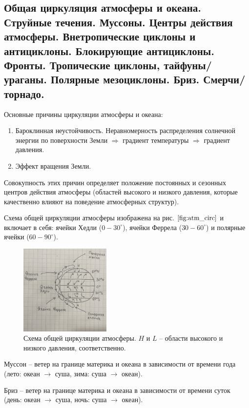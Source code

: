 \subsection{Общая циркуляция атмосферы и океана. Струйные течения. Муссоны. Центры действия атмосферы. Внетропические циклоны и антициклоны. Блокирующие антициклоны. Фронты. Тропические циклоны, тайфуны/ураганы. Полярные мезоциклоны. Бриз. Смерчи/торнадо.}
Основные причины циркуляции атмосферы и океана:
\begin{enumerate}
\item Бароклинная неустойчивость. Неравномерность распределения солнечной энергии по поверхности Земли $\Rightarrow$ градиент температуры $\Rightarrow$ градиент давления.
\item Эффект вращения Земли.
\end{enumerate}

Совокупность этих причин определяет положение постоянных и сезонных центров действия атмосферы (областей высокого и низкого давления, которые качественно влияют на поведение атмосферных структур).

Схема общей циркуляции атмосферы изображена на рис. $\ref{fig:atm_circ}$ и включает в себя: ячейки Хедли ($0-30^\circ$), ячейки Феррела ($30-60^\circ$) и полярные ячейки ($60-90^\circ$).

\begin{figure}[!ht]
\centering
\includegraphics[width=0.4\textwidth]{images/atm_circ.png}
\caption{Схема общей циркуляции атмосферы. $H$ и $L$ -- области высокого и низкого давления, соответственно.}\label{fig:atm_circ}
\end{figure}

Муссон -- ветер на границе материка и океана в зависимости от времени года (лето: океан $\rightarrow$ суша, зима: суша $\rightarrow$ океан).

Бриз -- ветер на границе материка и океана в зависимости от времени суток (день: океан $\rightarrow$ суша, ночь: суша $\rightarrow$ океан).

